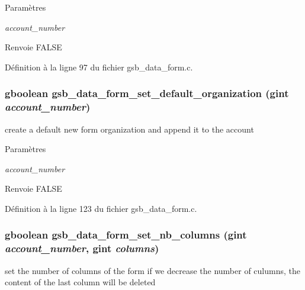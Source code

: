 \begin{DoxyParams}{Paramètres}
\item[{\em account\_\-number}]\end{DoxyParams}
\begin{DoxyReturn}{Renvoie}
FALSE 
\end{DoxyReturn}


Définition à la ligne 97 du fichier gsb\_\-data\_\-form.c.

\subsubsection[{gsb\_\-data\_\-form\_\-set\_\-default\_\-organization}]{\setlength{\rightskip}{0pt plus 5cm}gboolean gsb\_\-data\_\-form\_\-set\_\-default\_\-organization (gint {\em account\_\-number})}\label{gsb__data__form_8c_a4f0c2bea1f39f695cccdee80bb8fe2ee}
create a default new form organization and append it to the account


\begin{DoxyParams}{Paramètres}
\item[{\em account\_\-number}]\end{DoxyParams}
\begin{DoxyReturn}{Renvoie}
FALSE 
\end{DoxyReturn}


Définition à la ligne 123 du fichier gsb\_\-data\_\-form.c.

\subsubsection[{gsb\_\-data\_\-form\_\-set\_\-nb\_\-columns}]{\setlength{\rightskip}{0pt plus 5cm}gboolean gsb\_\-data\_\-form\_\-set\_\-nb\_\-columns (gint {\em account\_\-number}, \/  gint {\em columns})}\label{gsb__data__form_8c_a9b4608cf8f2ffba4904a2fdd6263e8b6}
set the number of columns of the form if we decrease the number of culumns, the content of the last column will be deleted


